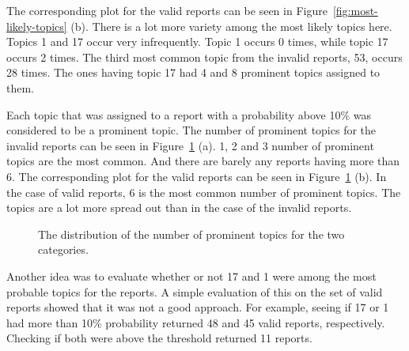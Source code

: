 The corresponding plot for the valid reports can be seen in Figure~\ref{fig:most-likely-topics} (b).
There is a lot more variety among the most likely topics here.
Topics 1 and 17 occur very infrequently.
Topic 1 occurs 0 times, while topic 17 occurs 2 times.
The third most common topic from the invalid reports, 53, occurs 28 times.
The ones having topic 17 had 4 and 8 prominent topics assigned to them.

Each topic that was assigned to a report with a probability above 10\% was considered to be a prominent topic.
The number of prominent topics for the invalid reports can be seen in Figure~\ref{fig:prominent-topic-dist} (a).
1, 2 and 3 number of prominent topics are the most common.
And there are barely any reports having more than 6.
The corresponding plot for the valid reports can be seen in Figure~\ref{fig:prominent-topic-dist} (b).
In the case of valid reports, 6 is the most common number of prominent topics. 
The topics are a lot more spread out than in the case of the invalid reports.

\begin{figure}[h!]
    \centering
    \caption{The distribution of the number of prominent topics for the two categories.}
    \label{fig:prominent-topic-dist}
\end{figure}

Another idea was to evaluate whether or not 17 and 1 were among the most probable topics for the reports.
A simple evaluation of this on the set of valid reports showed that it was not a good approach.
For example, seeing if 17 or 1 had more than 10\% probability returned 48 and 45 valid reports, respectively.
Checking if both were above the threshold returned 11 reports.